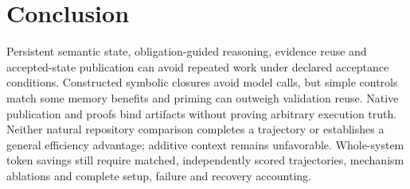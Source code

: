 \section{Conclusion}
\label{sec:conclusion}

Persistent semantic state, obligation-guided reasoning, evidence reuse and
accepted-state publication can avoid repeated work under declared acceptance
conditions. Constructed symbolic closures avoid model calls, but simple controls
match some memory benefits and priming can outweigh validation reuse. Native
publication and proofs bind artifacts without proving arbitrary execution truth.
Neither natural repository comparison completes a trajectory or establishes a
general efficiency advantage; additive context remains unfavorable. Whole-system
token savings still require matched, independently scored trajectories, mechanism
ablations and complete setup, failure and recovery accounting.
